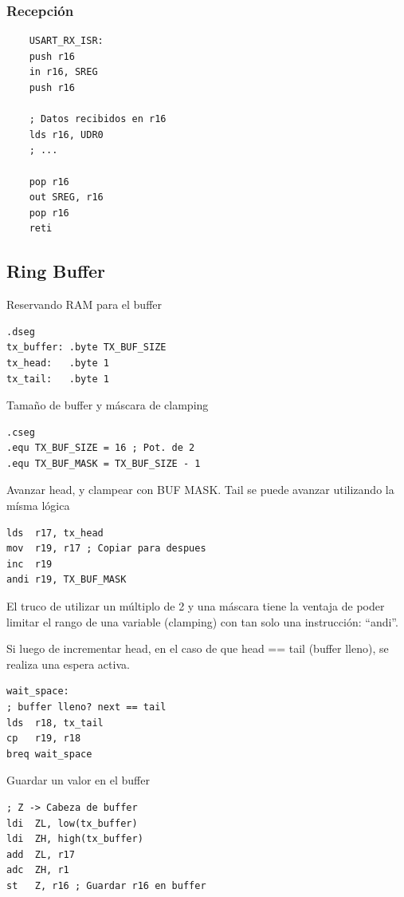     \subsubsection{Recepción}

    \begin{verbatim}
    USART_RX_ISR:
    push r16 
    in r16, SREG 
    push r16 

    ; Datos recibidos en r16
    lds r16, UDR0
    ; ...

    pop r16
    out SREG, r16
    pop r16	
    reti
    \end{verbatim}

\subsection{Ring Buffer}\label{anexo:Ring_Buffer}

Reservando RAM para el buffer
\begin{verbatim}
.dseg 
tx_buffer: .byte TX_BUF_SIZE  
tx_head:   .byte 1            
tx_tail:   .byte 1
\end{verbatim}

Tamaño de buffer y máscara de clamping
\begin{verbatim}
.cseg
.equ TX_BUF_SIZE = 16 ; Pot. de 2
.equ TX_BUF_MASK = TX_BUF_SIZE - 1
\end{verbatim}

Avanzar head, y clampear con BUF MASK. Tail se puede avanzar utilizando la mísma lógica
\begin{verbatim}
lds  r17, tx_head
mov  r19, r17 ; Copiar para despues
inc  r19
andi r19, TX_BUF_MASK
\end{verbatim}

El truco de utilizar un múltiplo de 2 y una máscara tiene la ventaja de poder limitar el rango de una variable (clamping) con tan solo una instrucción: ``andi''. 

Si luego de incrementar head, en el caso de que head == tail (buffer lleno), se realiza una espera activa. 
\begin{verbatim}
wait_space: 
; buffer lleno? next == tail
lds  r18, tx_tail
cp   r19, r18
breq wait_space
\end{verbatim}

Guardar un valor en el buffer
\begin{verbatim}
; Z -> Cabeza de buffer
ldi  ZL, low(tx_buffer)
ldi  ZH, high(tx_buffer)
add  ZL, r17 
adc  ZH, r1
st   Z, r16 ; Guardar r16 en buffer
\end{verbatim}

